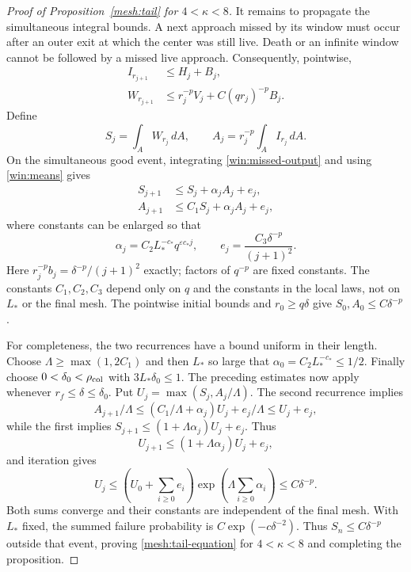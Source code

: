 \documentclass[11pt]{article}
\theoremstyle{definition}
\theoremstyle{remark}
\numberwithin{equation}{section}
\begin{document}
\begin{proof}[Proof of Proposition~\ref{mesh:tail} for $4<\kappa<8$]
It remains to propagate the simultaneous integral bounds.  A next
approach missed by its window must occur after an outer exit at which
the center was still live.  Death or an infinite window cannot be
followed by a missed live approach.  Consequently, pointwise,
\begin{equation}
 \begin{split}
 I_{r_{j+1}}&\le H_j+B_j,\\
 W_{r_{j+1}}&\le r_j^{-p}V_j+C(qr_j)^{-p}B_j.
 \end{split}
 \label{win:missed-output}
\end{equation}
Define
\[
 S_j=\int_A W_{r_j}\,dA,\qquad
 A_j=r_j^{-p}\int_A I_{r_j}\,dA.
\]
On the simultaneous good event, integrating
\eqref{win:missed-output} and using \eqref{win:means} gives
\begin{equation}
 \begin{split}
 S_{j+1}&\le S_j+\alpha_j A_j+e_j,\\
 A_{j+1}&\le C_1 S_j+\alpha_j A_j+e_j,
 \end{split}
 \label{win:recurrences}
\end{equation}
where constants can be enlarged so that
\[
 \alpha_j=C_2L_*^{-c_*}q^{\varepsilon c_*j},\qquad
 e_j=\frac{C_3\delta^{-p}}{(j+1)^2}.
\]
Here $r_j^{-p}b_j=\delta^{-p}/(j+1)^2$ exactly; factors of $q^{-p}$
are fixed constants.  The constants $C_1,C_2,C_3$ depend only on
$q$ and the constants in the local laws, not on $L_*$ or the final mesh.
The pointwise initial bounds and
$r_0\ge q\delta$ give $S_0,A_0\le C\delta^{-p}$.

For completeness, the two recurrences have a bound uniform in their
length.  Choose $\Lambda\ge\max(1,2C_1)$ and then $L_*$ so large that
$\alpha_0=C_2L_*^{-c_*}\le1/2$.  Finally choose
$0<\delta_0<\rho_{\rm col}$ with $3L_*\delta_0\le1$.  The preceding
estimates now apply whenever $r_f\le\delta\le\delta_0$.
Put $U_j=\max(S_j,A_j/\Lambda)$.  The second recurrence
implies
\[
 A_{j+1}/\Lambda
 \le(C_1/\Lambda+\alpha_j)U_j+e_j/\Lambda\le U_j+e_j,
\]
while the first implies
$S_{j+1}\le(1+\Lambda\alpha_j)U_j+e_j$.  Thus
\[
 U_{j+1}\le(1+\Lambda\alpha_j)U_j+e_j,
\]
and iteration gives
\[
 U_j\le\left(U_0+\sum_{i\ge0}e_i\right)
          \exp\left(\Lambda\sum_{i\ge0}\alpha_i\right)
       \le C\delta^{-p}.
\]
Both sums converge and their constants are independent of the final
mesh.  With $L_*$ fixed, the summed failure probability is
$C\exp(-c\delta^{-2})$.  Thus $S_n\le C\delta^{-p}$ outside that event,
proving \eqref{mesh:tail-equation} for $4<\kappa<8$ and completing the proposition.
\end{proof}
\end{document}
